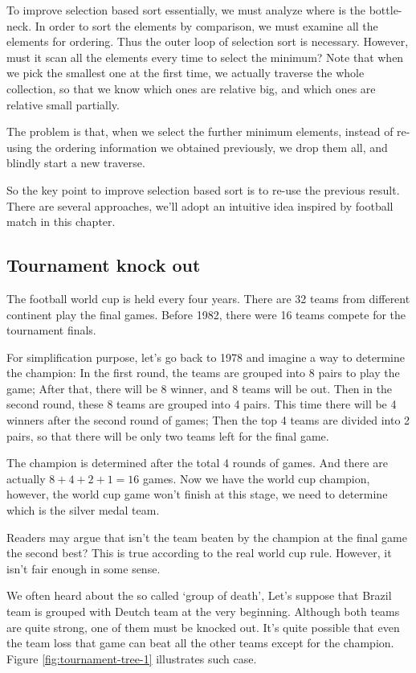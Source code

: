 \documentclass{article}
\begin{document}
To improve selection based sort essentially, we must analyze where is the bottle-neck. In order to sort
the elements by comparison, we must examine all the elements for ordering. Thus the outer loop of selection
sort is necessary. However, must it scan all the elements every time to select the minimum? Note that
when we pick the smallest one at the first time, we actually traverse the whole collection, so that
we know which ones are relative big, and which ones are relative small partially.

The problem is that, when we select the further minimum elements, instead of re-using the ordering information
we obtained previously, we drop them all, and blindly start a new traverse.

So the key point to improve selection based sort is to re-use the previous result. There are several approaches,
we'll adopt an intuitive idea inspired by football match in this chapter.

\subsection{Tournament knock out}
The football world cup is held every four years. There are 32 teams from different continent
play the final games. Before 1982, there were 16 teams compete for the tournament finals\cite{wiki-wc}.

For simplification purpose, let's go back to 1978 and imagine a way to determine the champion:
In the first round, the teams
are grouped into 8 pairs to play the game; After that, there will be 8 winner, and 8 teams will
be out. Then in the second round, these 8 teams are grouped into 4 pairs. This time there
will be 4 winners after the second round of games; Then the top 4 teams are divided into
2 pairs, so that there will be only two teams left for the final game.

The champion is determined after the total 4 rounds of games. And there are actually $8+4+2+1 = 16$
games. Now we have the world cup champion, however, the world cup game won't finish at this stage,
we need to determine which is the silver medal team.

Readers may argue that isn't the team beaten by the champion at the final game the second best?
This is true according to the real world cup rule. However, it isn't fair enough in some sense.

We often heard about the so called `group of death', Let's suppose that Brazil team is
grouped with Deutch team at the very beginning. Although both teams are quite strong, one of
them must be knocked out. It's quite possible that even the team loss that game can beat
all the other teams except for the champion. Figure \ref{fig:tournament-tree-1} illustrates such
case.
\end{document}
